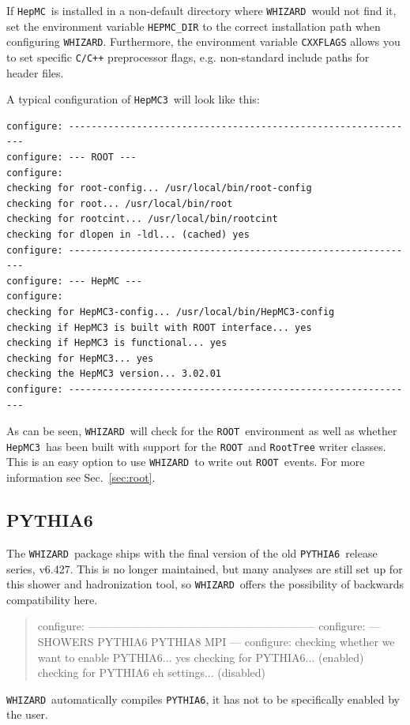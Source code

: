 \documentclass[12pt]{book}
\newcommand{\ttt}[1]{\texttt{#1}}
\newcommand{\whizard}{\ttt{WHIZARD}}
\newcommand{\pythiasix}{\ttt{PYTHIA6}}
\newcommand{\hepmc}{\ttt{HepMC}}
\newcommand{\hepmcthree}{\ttt{HepMC3}}
\newcommand{\ROOT}{\ttt{ROOT}}
\begin{document}
If \hepmc\ is installed in a non-default directory where \whizard\
would not find it, set the environment variable \ttt{HEPMC\_DIR} to
the correct installation path when configuring \whizard.  Furthermore,
the environment variable \ttt{CXXFLAGS} allows you to set specific
\ttt{C/C++} preprocessor flags, e.g. non-standard include paths for
header files.

A typical configuration of \hepmcthree\ will look like this:
\begin{footnotesize}
\begin{verbatim}
configure: --------------------------------------------------------------
configure: --- ROOT ---
configure:
checking for root-config... /usr/local/bin/root-config
checking for root... /usr/local/bin/root
checking for rootcint... /usr/local/bin/rootcint
checking for dlopen in -ldl... (cached) yes
configure: --------------------------------------------------------------
configure: --- HepMC ---
configure:
checking for HepMC3-config... /usr/local/bin/HepMC3-config
checking if HepMC3 is built with ROOT interface... yes
checking if HepMC3 is functional... yes
checking for HepMC3... yes
checking the HepMC3 version... 3.02.01
configure: --------------------------------------------------------------
\end{verbatim}
\end{footnotesize}
As can be seen, \whizard\ will check for the \ROOT\ environment as
well as whether \hepmcthree\ has been built with support for the
\ROOT\ and \ttt{RootTree} writer classes. This is an easy option to
use \whizard\ to write out \ROOT\ events. For more information see
Sec.~\ref{sec:root}.


\subsection{PYTHIA6}
\label{sec:pythia6_conf}

The \whizard\ package ships with the final version of the old
\pythiasix\ release series, v6.427. This is no longer maintained, but
many analyses are still set up for this shower and hadronization tool,
so \whizard\ offers the possibility of backwards compatibility here.
\begin{quote}
configure: --------------------------------------------------------------
configure: --- SHOWERS PYTHIA6 PYTHIA8 MPI ---
configure:
checking whether we want to enable PYTHIA6... yes
checking for PYTHIA6... (enabled)
checking for PYTHIA6 eh settings... (disabled)
\end{quote}
\whizard\ automatically compiles \pythiasix, it has not to be
specifically enabled by the user.
\end{document}
